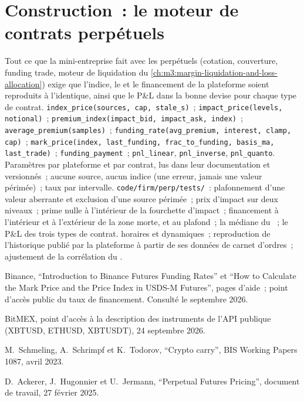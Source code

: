 \section{Construction~: le moteur de contrats perpétuels}\label{bld:m3:perpetual-futures:perp}

\begin{build}
 Tout ce que la mini-entreprise fait avec les perpétuels (cotation, couverture, funding trade, moteur
de liquidation du \cref{ch:m3:margin-liquidation-and-loss-allocation}) exige que l'indice, le  et le financement de la plateforme soient
reproduits à l'identique, ainsi que le P\&L dans la bonne devise pour chaque type de contrat.
 \texttt{index\_price(sources, cap, stale\_s)}~; \texttt{impact\_price(levels, notional)}~;
\texttt{premium\_index(impact\_bid, impact\_ask, index)}~; \texttt{average\_premium(samples)}~;
\texttt{funding\_rate(avg\_premium, interest, clamp, cap)}~; \texttt{mark\_price(index, last\_funding,
frac\_to\_funding, basis\_ma, last\_trade)}~; \texttt{funding\_payment}~; \texttt{pnl\_linear}, \texttt{pnl\_inverse},
\texttt{pnl\_quanto}.
 Paramètres par plateforme et par contrat, lus dans leur documentation et versionnés~; aucune source, aucun indice (une
erreur, jamais une valeur périmée)~; taux par intervalle.
 \texttt{code/firm/perp/tests/}~: plafonnement d'une valeur aberrante et exclusion d'une source périmée~;
prix d'impact sur deux niveaux~; prime nulle à l'intérieur de la fourchette d'impact~; financement à l'intérieur et à l'extérieur de la zone morte, et au
plafond~; la médiane du ~; le P\&L des trois types de contrat.
  horaires et dynamiques~; reproduction de l'historique publié par la plateforme à partir
de ses données de carnet d'ordres~; ajustement de la corrélation du .
\end{build}

\begin{omsources}
\item Binance, ``Introduction to Binance Futures Funding Rates'' et ``How to Calculate the Mark Price and the Price
Index in USDS-M Futures'', pages d'aide~; point d'accès public du taux de financement. Consulté le
septembre 2026.
\item BitMEX, point d'accès à la description des instruments de l'API publique (XBTUSD, ETHUSD, XBTUSDT), 24 septembre 2026.
\item M.~Schmeling, A.~Schrimpf et K.~Todorov, ``Crypto carry'', BIS Working Papers 1087, avril 2023.
\item D.~Ackerer, J.~Hugonnier et U.~Jermann, ``Perpetual Futures Pricing'', document de travail, 27 février 2025.
\end{omsources}


